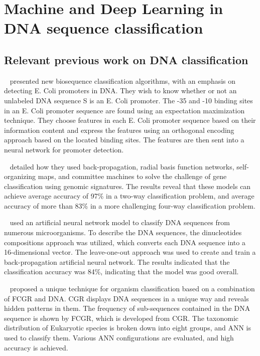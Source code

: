 \chapter{Machine and Deep Learning in DNA sequence classification} \label{sec:ml_dl_dna}

\section{Relevant previous work on DNA classification}

\citeauthor{Ma2001DNAStudy}~\cite{Ma2001DNAStudy} presented new biosequence classification algorithms, with an emphasis on detecting E. Coli promoters in \gls{DNA}. They wish to know whether or not an unlabeled \gls{DNA} sequence S is an E. Coli promoter. The -35 and -10 binding sites in an E. Coli promoter sequence are found using an expectation maximization technique. They choose features in each E. Coli promoter sequence based on their information content and express the features using an orthogonal encoding approach based on the located binding sites. The features are then sent into a neural network for promoter detection.

\citeauthor{Chen2002NeuralAnalysis}~\cite{Chen2002NeuralAnalysis} detailed how they used back-propagation, radial basis function networks, self-organizing maps, and committee machines to solve the challenge of gene classification using genomic signatures. The results reveal that these models can achieve average accuracy of 97\% in a two-way classification problem, and average accuracy of more than 83\% in a more challenging four-way classification problem.

\citeauthor{You2009ClassificationCompositions}~\cite{You2009ClassificationCompositions} used an artificial neural network model to classify DNA sequences from numerous microorganisms. To describe the DNA sequences, the dinucleotides compositions approach was utilized, which converts each DNA sequence into a 16-dimensional vector. The leave-one-out approach was used to create and train a back-propagation artificial neural network. The results indicated that the classification accuracy was 84\%, indicating that the model was good overall.

\citeauthor{Nair2010ANNRepresentation}~\cite{Nair2010ANNRepresentation} proposed a unique technique for organism classification based on a combination of \gls{FCGR} and \gls{DNA}. \gls{CGR} displays \gls{DNA} sequences in a unique way and reveals hidden patterns in them. The frequency of sub-sequences contained in the \gls{DNA} sequence is shown by \gls{FCGR}, which is developed from \gls{CGR}. The taxonomic distribution of Eukaryotic species is broken down into eight groups, and \gls{ANN} is used to classify them. Various \gls{ANN} configurations are evaluated, and high accuracy is achieved.

